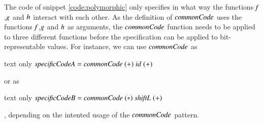 The code of snippet \ref{code:polymorphic} only specifies in what way the functions \ensuremath{\Varid{f}},\ensuremath{\Varid{g}} and \ensuremath{\Varid{h}} interact with each other.
As the definition of \ensuremath{\Varid{commonCode}} uses the functions \ensuremath{\Varid{f}},\ensuremath{\Varid{g}} and \ensuremath{\Varid{h}} as arguments, the \ensuremath{\Varid{commonCode}} function needs to be applied to three different functions before the specification can be applied to bit-representable values.
For instance, we can use \ensuremath{\Varid{commonCode}} as 
\begin{changemargin}{1cm}{0cm}
\begin{expansionno}{text only}
\ensuremath{\Varid{specificCodeA}\mathrel{=}\Varid{commonCode}\;(\mathbin{+})\;\Varid{id}\;(\mathbin{+})}
\end{expansionno}
\end{changemargin}
or as 
\begin{changemargin}{1cm}{0cm}
\begin{expansionno}{text only}
\ensuremath{\Varid{specificCodeB}\mathrel{=}\Varid{commonCode}\;(\mathbin{*})\;\Varid{shiftL}\;(\mathbin{+})}
\end{expansionno}
\end{changemargin}
, depending on the intented usage of the \ensuremath{\Varid{commonCode}} pattern.

